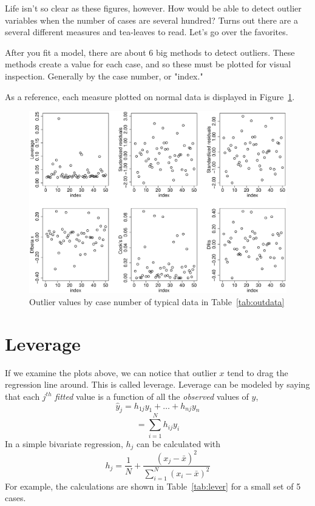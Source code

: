 Life isn’t so clear as these figures, however. How would be able to detect outlier variables when the number of cases are several hundred? Turns out there are a several different measures and tea-leaves to read. Let’s go over the favorites.

After you fit a model, there are about 6 big methods to detect outliers. These methods create a value for each case, and so these must be plotted for visual inspection. Generally by the case number, or "index."

As a reference, each measure plotted on normal data is displayed in Figure~\ref{fig:outnorm}.

\begin{figure}
   \centering
   \includegraphics[angle=0,
           width=.75\textwidth]{normal_allmeasures_index.eps}
   \caption{Outlier values by case number of typical data in Table~\ref{tab:outdata}}
  \label{fig:outnorm}
\end{figure}

\section{Leverage}

If we examine the plots above, we can notice that outlier $x$ tend to drag the regression line around. This is called leverage. Leverage can be modeled by saying that each $j^{th}$ {\it fitted} value is a function of all the {\it observed} values of $y$,
\begin{equation}
\hat{y}_j=h_{1j}y_1+\ldots+h_{nj}y_n
\end{equation}
\begin{equation}
=\sum_{i=1}^N h_{ij}y_i
\end{equation}
In a simple bivariate regression, $h_j$ can be calculated with
\begin{equation}
h_j=\frac{1}{N}+\frac{\left(x_j-\bar{x}\right)^2}{\sum_{i=1}^N\left(x_i-\bar{x}\right)^2}
\end{equation}
For example, the calculations are shown in Table~\ref{tab:lever} for a small set of 5 cases.

